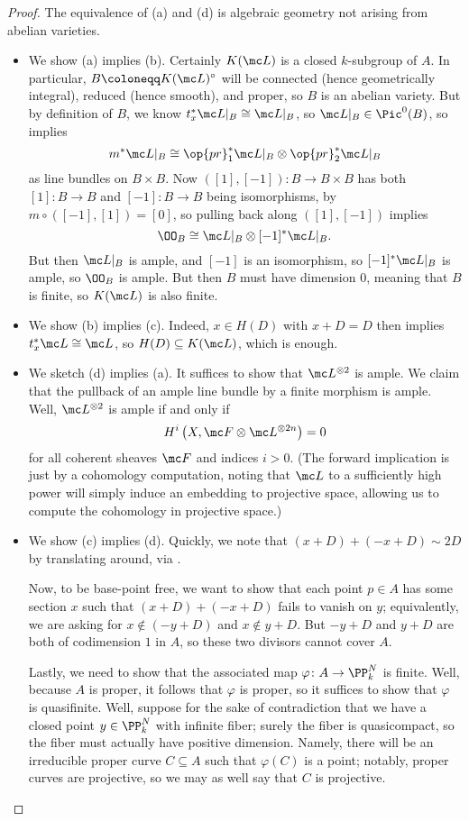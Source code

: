 \documentclass[../notes.tex]{subfiles}
\begin{document}
\begin{proof}
	The equivalence of (a) and (d) is algebraic geometry not arising from abelian varieties.
	\begin{itemize}
		\item We show (a) implies (b). Certainly $K(\mc L)$ is a closed $k$-subgroup of $A$. In particular, $B\coloneqq K(\mc L)^\circ$ will be connected (hence geometrically integral), reduced (hence smooth), and proper, so $B$ is an abelian variety. But by definition of $B$, we know $t_x^*\mc L|_B\cong\mc L|_B$, so $\mc L|_B\in\Pic^0(B)$, so  implies
		\[m^*\mc L|_B\cong\op{pr}_1^*\mc L|_B\otimes\op{pr}_2^*\mc L|_B\]
		as line bundles on $B\times B$. Now $([1],[-1])\colon B\to B\times B$ has both $[1]\colon B\to B$ and $[-1]\colon B\to B$ being isomorphisms, by $m\circ([-1],[1])=[0]$, so pulling back along $([1],[-1])$ implies
		\[\OO_B\cong\mc L|_B\otimes[-1]^*\mc L|_B.\]
		But then $\mc L|_B$ is ample, and $[-1]$ is an isomorphism, so $[-1]^*\mc L|_B$ is ample, so $\OO_B$ is ample. But then $B$ must have dimension $0$, meaning that $B$ is finite, so $K(\mc L)$ is also finite.
		\item We show (b) implies (c). Indeed, $x\in H(D)$ with $x+D=D$ then implies $t_x^*\mc L\cong\mc L$, so $H(D)\subseteq K(\mc L)$, which is enough.
		\item We sketch (d) implies (a). It suffices to show that $\mc L^{\otimes2}$ is ample. We claim that the pullback of an ample line bundle by a finite morphism is ample. Well, $\mc L^{\otimes2}$ is ample if and only if
		\[H^i\left(X,\mc F\otimes\mc L^{\otimes2n}\right)=0\]
		for all coherent sheaves $\mc F$ and indices $i>0$. (The forward implication is just by a cohomology computation, noting that $\mc L$ to a sufficiently high power will simply induce an embedding to projective space, allowing us to compute the cohomology in projective space.)
		\item We show (c) implies (d). Quickly, we note that $(x+D)+(-x+D)\sim2D$ by translating around, via .

		Now, to be base-point free, we want to show that each point $p\in A$ has some section $x$ such that $(x+D)+(-x+D)$ fails to vanish on $y$; equivalently, we are asking for $x\notin(-y+D)$ and $x\notin y+D$. But $-y+D$ and $y+D$ are both of codimension $1$ in $A$, so these two divisors cannot cover $A$.

		Lastly, we need to show that the associated map $\varphi\colon A\to\PP^N_k$ is finite. Well, because $A$ is proper, it follows that $\varphi$ is proper, so it suffices to show that $\varphi$ is quasifinite. Well, suppose for the sake of contradiction that we have a closed point $y\in\PP^N_k$ with infinite fiber; surely the fiber is quasicompact, so the fiber must actually have positive dimension. Namely, there will be an irreducible proper curve $C\subseteq A$ such that $\varphi(C)$ is a point; notably, proper curves are projective, so we may as well say that $C$ is projective.


\end{itemize}
\end{proof}
\end{document}
